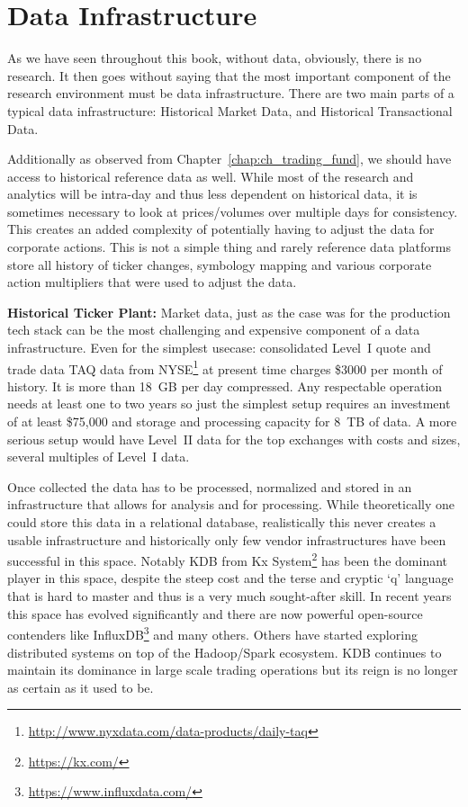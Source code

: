 \section{Data Infrastructure\label{sec:tech_data_infra}}\label{in:dat_infr1}

As we have seen throughout this book, without data, obviously, there is no research. It then goes without saying that the most important component of the research environment must be data infrastructure. There are two main parts of a typical data infrastructure: Historical Market Data, and Historical Transactional Data. 


Additionally as observed from Chapter~\ref{chap:ch_trading_fund}, we should have access to historical reference data as well. While most of the research and analytics will be intra-day and thus less dependent on historical data, it is sometimes necessary to look at prices/volumes over multiple days for consistency. This creates an added complexity of potentially having to adjust the data for corporate actions. This is not a simple thing and rarely reference data platforms store all history of ticker changes, symbology mapping and various corporate action multipliers that were used to adjust the data. \twomedskip


\noindent\textbf{Historical Ticker Plant:}\label{in:hist_tick_plant} Market data, just as the case was for the production tech stack can be the most challenging and expensive component of a data infrastructure. Even for  the simplest usecase: consolidated Level~I quote and trade data TAQ data\label{in:taq3} from NYSE\footnote{\url{http://www.nyxdata.com/data-products/daily-taq}} at present time charges \$3000 per month of history. It is more than 18~GB per day compressed. Any respectable operation needs at least one to two years so just the simplest setup requires an investment of at least \$75,000 and storage and processing capacity for 8~TB of data. A more serious setup would have Level~II data for the top exchanges with costs and sizes, several multiples of Level~I data. \label{in:level2dat2}


Once collected the data has to be processed, normalized and stored in an infrastructure that allows for analysis and for processing. While theoretically one could store this data in a relational database, realistically this never creates a usable infrastructure and historically only few vendor infrastructures have been successful in this space. Notably KDB from Kx System\footnote{\url{https://kx.com/}} has been the dominant player in this space, despite the steep cost and the terse and cryptic `q' language that is hard to master and thus is a very much sought-after skill. In recent years this space has evolved significantly and there are now powerful open-source contenders like InfluxDB\footnote{\url{https://www.influxdata.com/}} and many others. Others have started exploring distributed systems on top of the Hadoop/Spark ecosystem. KDB continues to maintain its dominance in large scale trading operations but its reign is no longer as certain as it used to be.


